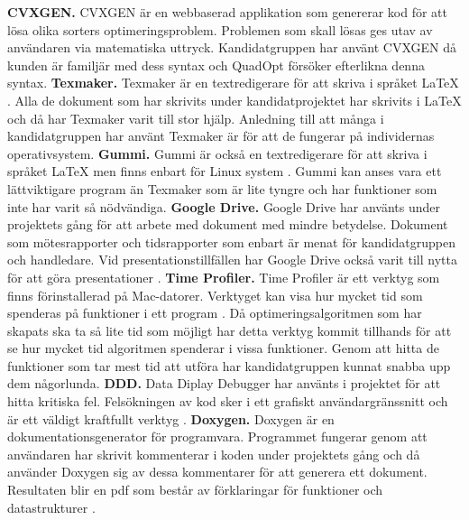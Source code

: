 \newline
\newline
\textbf{CVXGEN.} CVXGEN är en webbaserad applikation som genererar kod för att lösa olika sorters optimeringsproblem. Problemen som skall lösas ges utav av användaren via matematiska uttryck. \cite{cvxgen} Kandidatgruppen har använt CVXGEN då kunden är familjär med dess syntax och QuadOpt försöker efterlikna denna syntax. 
\newline
\newline
\textbf{Texmaker.} Texmaker är en textredigerare för att skriva i språket \LaTeX \hspace{0.2mm} \citep{texmaker}. Alla de dokument som har skrivits under kandidatprojektet har skrivits i {\LaTeX} och då har Texmaker varit till stor hjälp. Anledning till att många i kandidatgruppen har använt Texmaker är för att de fungerar på individernas operativsystem.
\newline
\newline
\textbf{Gummi.} Gummi är också en textredigerare för att skriva i språket {\LaTeX} men finns enbart för Linux system \citep{gummi}. Gummi kan anses vara ett lättviktigare program än Texmaker som är lite tyngre och har funktioner som inte har varit så nödvändiga.
\newline
\newline
\textbf{Google Drive.} Google Drive har använts under projektets gång för att arbete med dokument med mindre betydelse. Dokument som mötesrapporter och tidsrapporter som enbart är menat för kandidatgruppen och handledare. Vid presentationstillfällen har Google Drive också varit till nytta för att göra presentationer \citep{gdrive}.
\newline
\newline
\textbf{Time Profiler.} Time Profiler är ett verktyg som finns förinstallerad på Mac-datorer. Verktyget kan visa hur mycket tid som spenderas på funktioner i ett program \citep{timeprofiler}. Då optimeringsalgoritmen som har skapats ska ta så lite tid som möjligt har detta verktyg kommit tillhands för att se hur mycket tid algoritmen spenderar i vissa funktioner. Genom att hitta de funktioner som tar mest tid att utföra har kandidatgruppen kunnat snabba upp dem någorlunda.
\newline
\newline
\textbf{DDD.} Data Diplay Debugger har använts i projektet för att hitta kritiska fel. Felsökningen av kod sker i ett grafiskt användargränssnitt och är ett väldigt kraftfullt verktyg \citep{ddd}.
\newline
\newline
\textbf{Doxygen.} Doxygen är en dokumentationsgenerator för programvara. Programmet fungerar genom att användaren har skrivit kommenterar i koden under projektets gång och då använder Doxygen sig av dessa kommentarer för att generera ett dokument. Resultaten blir en pdf som består av förklaringar för funktioner och datastrukturer \citep{Doxygen}. 

